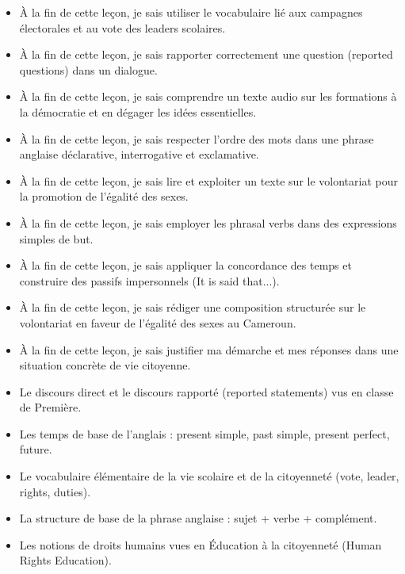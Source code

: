 \documentclass[11pt]{article}
\begin{document}
\begin{objectifs}
\begin{itemize}
\item À la fin de cette leçon, je sais utiliser le vocabulaire lié aux campagnes électorales et au vote des leaders scolaires.
\item À la fin de cette leçon, je sais rapporter correctement une question (reported questions) dans un dialogue.
\item À la fin de cette leçon, je sais comprendre un texte audio sur les formations à la démocratie et en dégager les idées essentielles.
\item À la fin de cette leçon, je sais respecter l'ordre des mots dans une phrase anglaise déclarative, interrogative et exclamative.
\item À la fin de cette leçon, je sais lire et exploiter un texte sur le volontariat pour la promotion de l'égalité des sexes.
\item À la fin de cette leçon, je sais employer les phrasal verbs dans des expressions simples de but.
\item À la fin de cette leçon, je sais appliquer la concordance des temps et construire des passifs impersonnels (It is said that...).
\item À la fin de cette leçon, je sais rédiger une composition structurée sur le volontariat en faveur de l'égalité des sexes au Cameroun.
\item À la fin de cette leçon, je sais justifier ma démarche et mes réponses dans une situation concrète de vie citoyenne.
\end{itemize}
\end{objectifs}

\begin{prerequis}
\begin{itemize}
\item Le discours direct et le discours rapporté (reported statements) vus en classe de Première.
\item Les temps de base de l'anglais : present simple, past simple, present perfect, future.
\item Le vocabulaire élémentaire de la vie scolaire et de la citoyenneté (vote, leader, rights, duties).
\item La structure de base de la phrase anglaise : sujet + verbe + complément.
\item Les notions de droits humains vues en Éducation à la citoyenneté (Human Rights Education).
\end{itemize}
\end{prerequis}
\end{document}
